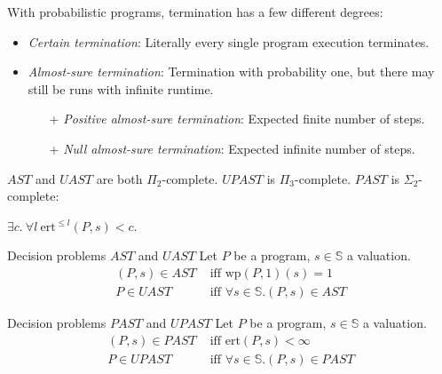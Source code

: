 \documentclass[english]{panikzettel}
\renewcommand{\wp}{\mathrm{wp}}
\newcommand{\ert}{\mathrm{ert}}
\begin{document}
\begin{halfboxl}
    With probabilistic programs, termination has a few different degrees:
    \begin{itemize}[leftmargin=*]
        \item \emph{Certain termination}: Literally every single program execution terminates.
        \item \emph{Almost-sure termination}: Termination with probability one, but there may still be runs with infinite runtime.
        \begin{itemize}
            \item[+] \emph{Positive almost-sure termination}: Expected finite number of steps.
            \item[+] \emph{Null almost-sure termination}: Expected infinite number of steps.
        \end{itemize}
    \end{itemize}

    $AST$ and $UAST$ are both $\Pi_2$-complete.
    $UPAST$ is $\Pi_3$-complete.
    $PAST$ is $\Sigma_2$-complete:
    \begin{tightcenter}
        $\exists c.\ \forall l\ \ert^{\leq l} (P,s) < c$.
    \end{tightcenter}
\end{halfboxl}%
\begin{halfboxr}
    \vspace{-\baselineskip}
    \begin{defi}{Decision problems $AST$ and $UAST$}
        Let $P$ be a program, $s \in \mathbb{S}$ a valuation.
        \begin{align*}
            (P,s) \in AST &\text{ iff } \wp(P,1)(s)=1 \\
            P \in UAST &\text{ iff } \forall s \in \mathbb{S}. (P,s) \in AST
        \end{align*}
    \end{defi}

    \begin{defi}{Decision problems $PAST$ and $UPAST$}
        Let $P$ be a program, $s \in \mathbb{S}$ a valuation.
        \begin{align*}
            (P,s) \in PAST &\text{ iff } \ert(P,s) < \infty \\
            P \in UPAST &\text{ iff } \forall s \in \mathbb{S}. (P,s) \in PAST
        \end{align*}
    \end{defi}
\end{halfboxr}
\end{document}
